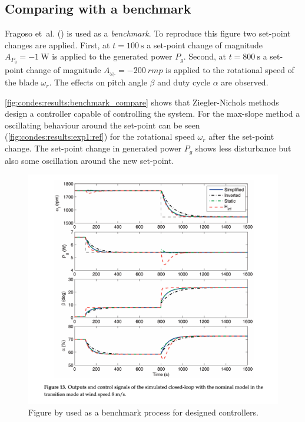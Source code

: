 \subsection{Comparing with a benchmark}

Fragoso et~al. (\cite[p. 14, Figure 13]{Fragoso_et_al_2017}) is used as a \textit{benchmark}.
To reproduce this figure two set-point changes are applied.
First, at $t=\SI{100}{\second}$ a set-point change of magnitude $A_{P_g}=\SI{-1}{\watt}$ is applied to the generated power $P_g$.
Second, at $t=\SI{800}{\second}$ a set-point change of magnitude $A_{\omega_r}=\SI{-200}{rmp}$ is applied to the rotational speed of the blade $\omega_r$.
The effects on pitch angle $\beta$ and duty cycle $\alpha$ are observed.

\autoref{fig:condes:results:benchmark_compare} shows that Ziegler-Nichols methods design a controller capable of controlling the system.
For the max-slope method a oscillating behaviour around the set-point can be seen (\autoref{fig:condes:results:exp1:ref}) for the rotational speed $\omega_r$ after the set-point change.
The set-point change in generated power $P_g$ shows less disturbance but also some oscillation around the new set-point.

\begin{figure}[H]
    \center
    \includegraphics[width=1\textwidth,scale=1,trim=0 0 0 0,clip]{fig/Fragoso_et_al_2017_fig13.png}
    \caption{Figure by \cite{Fragoso_et_al_2017} used as a benchmark process for designed controllers.}
    \label{fig:condes:results:benchmark}
\end{figure}


